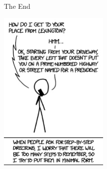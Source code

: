 \documentclass[aspectratio=169]{beamer}
\begin{document}
\begin{frame}{The End}

  \begin{center}
    \includegraphics[width=0.4\textwidth]{meme.png}
  \end{center}
\end{frame}
\end{document}
